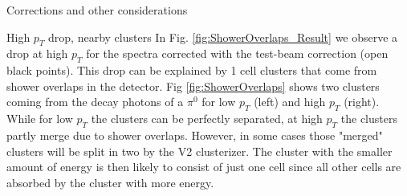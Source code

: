 \documentclass[ALICE]{ALICE_analysis_notes}
\newcommand{\PZ}{$\pi^0$\xspace}
\begin{document}
\begin{section}{Corrections and other considerations}
\newpage
\begin{subsection}{High $p_{T}$ drop, nearby clusters}
\label{sec:neighbors}
In Fig. \ref{fig:ShowerOverlaps_Result} we observe a drop at high $p_{T}$ for the spectra corrected with the test-beam correction (open black points). This drop can be explained by 1 cell clusters that come from shower overlaps in the detector. Fig \ref{fig:ShowerOverlaps} shows two clusters coming from the decay photons of a $\pi^{0}$ for low $p_{T}$ (left) and high $p_{T}$ (right). While for low $p_{T}$ the clusters can be perfectly separated, at high $p_{T}$ the clusters partly merge due to shower overlaps. However, in some cases those "merged" clusters will be split in two by the V2 clusterizer. The cluster with the smaller amount of energy is then likely to consist of just one cell since all other cells are absorbed by the cluster with more energy. \\

\end{subsection}
\end{section}
\end{document}
